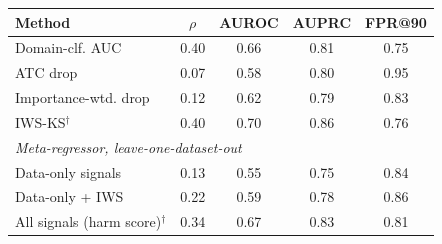 \begin{tabular}{lcccc}
\toprule
Method & $\rho$ & AUROC & AUPRC & FPR@90 \\
\midrule
Domain-clf. AUC & 0.40 & 0.66 & 0.81 & 0.75 \\
ATC drop & 0.07 & 0.58 & 0.80 & 0.95 \\
Importance-wtd. drop & 0.12 & 0.62 & 0.79 & 0.83 \\
IWS-KS$^\dagger$ & 0.40 & 0.70 & 0.86 & 0.76 \\
\midrule \multicolumn{5}{l}{\emph{Meta-regressor, leave-one-dataset-out}} \\
Data-only signals & 0.13 & 0.55 & 0.75 & 0.84 \\
Data-only + IWS & 0.22 & 0.59 & 0.78 & 0.86 \\
All signals (harm score)$^\dagger$ & 0.34 & 0.67 & 0.83 & 0.81 \\
\bottomrule
\end{tabular}